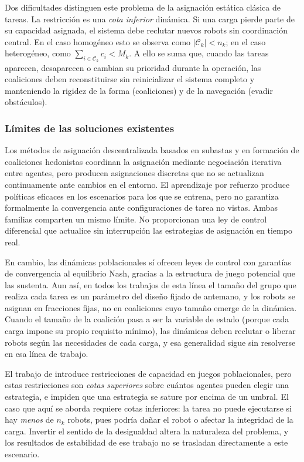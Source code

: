 

Dos dificultades distinguen este problema de la asignación estática clásica de tareas. La
restricción es una \emph{cota inferior} dinámica. Si una carga pierde parte de su
capacidad asignada, el sistema debe reclutar nuevos robots sin coordinación central.
En el caso homogéneo esto se observa como $|\mathcal{C}_k| < n_k$; en el caso
heterogéneo, como $\sum_{i\in\mathcal{C}_k} c_i < M_k$. A ello se suma que, cuando
las tareas aparecen, desaparecen o cambian su prioridad durante la operación, las
coaliciones deben reconstituirse sin reinicializar el sistema completo y manteniendo la rigidez de la forma (coaliciones) y de la navegación (evadir obstáculos).

\subsubsection{Límites de las soluciones existentes}

Los métodos de asignación descentralizada basados en subastas
\citep{choi2009consensus} y en formación de coaliciones hedo\-nistas
\citep{dutta2021hedonic, zhang2024coalition} coordinan la asignación mediante
negociación iterativa entre agentes, pero producen asignaciones discretas que
no se actualizan continuamente ante cambios en el entorno. El aprendizaje por refuerzo
\citep{bezerra2025learning} produce políticas eficaces en los escenarios para los que se
entrena, pero no garantiza formalmente la convergencia ante configuraciones de tarea no
vistas. Ambas familias comparten un mismo
límite. No proporcionan una ley de control diferencial que actualice sin interrupción
las estrategias de asignación en tiempo real.

En cambio, las dinámicas poblacionales \citep{barreiro2021uav, dinh2026bsplines,
hurtado2024potential} sí ofrecen leyes de control con garantías de convergencia
al equilibrio Nash, gracias a la estructura de juego potencial que las sustenta. Aun así,
en todos los trabajos de esta línea el tamaño del grupo que realiza
cada tarea es un parámetro del diseño fijado de antemano, y los robots se asignan
en fracciones fijas, no en coaliciones cuyo tamaño emerge de la dinámica.
Cuando el tamaño de la coalición pasa a ser la variable de estado (porque cada carga
impone su propio requisito mínimo), las dinámicas deben reclutar o liberar
robots según las necesidades de cada carga, y esa generalidad sigue sin resolverse en
esa línea de trabajo.

El trabajo de \citet{martinezpiazuelo2022automatica} introduce restricciones de
capacidad en juegos poblacionales, pero estas restricciones son \emph{cotas superiores}
sobre cuántos agentes pueden elegir una estrategia, e impiden que una estrategia se
sature por encima de un umbral. El caso que aquí se aborda requiere cotas inferiores:
la tarea no puede ejecutarse si hay \emph{menos} de $n_k$ robots, pues podría dañar el robot o afectar la integridad de la carga. Invertir el sentido de
la desigualdad altera la naturaleza del problema, y los resultados de estabilidad de ese
trabajo no se trasladan directamente a este escenario.

